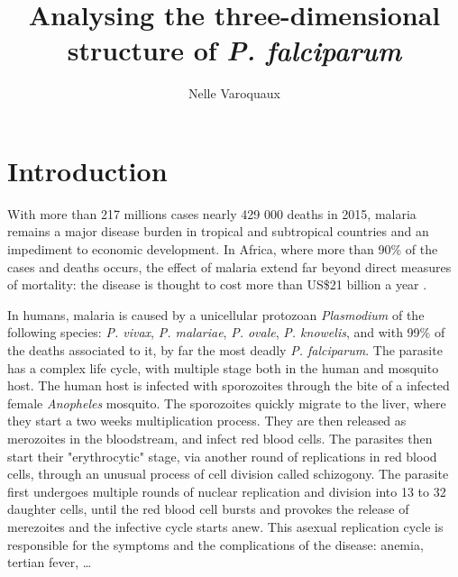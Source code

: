 \documentclass[letterpaper,12pt]{article}
\begin{document}
\title{Analysing the three-dimensional structure of {\em P. falciparum}}
\author{Nelle Varoquaux}



\begin{abstract}

\end{abstract}


\section{Introduction}
\label{sec:introduction}

With more than 217 millions cases nearly 429 000 deaths in 2015,  malaria
remains a major disease burden in tropical and subtropical countries and an
impediment to economic development. In Africa, where more than 90\% of the
cases and deaths occurs, the effect of malaria extend far beyond direct
measures of mortality: the disease is thought to cost more than US\$21
billion a year \citep{onwejkwe:do}.

In humans, malaria is caused by a unicellular protozoan {\em Plasmodium} of
the following species: {\em P. vivax}, {\em P. malariae}, {\em P. ovale}, {\em
P. knowelis}, and with 99\% of the deaths associated to it, by far the most
deadly {\em P. falciparum}. The parasite has a complex life cycle, with
multiple stage both in the human and mosquito host. The human host is infected
with sporozoites through the bite of a infected female  {\em Anopheles}
mosquito. The sporozoites quickly migrate to the liver, where they start a two
weeks multiplication process. They are then released as merozoites in the
bloodstream, and infect red blood cells. The parasites then start their
"erythrocytic" stage, via another round of replications in red blood cells,
through an unusual process of cell division called schizogony. The parasite
first undergoes multiple rounds of nuclear replication and division  into 13
to 32 daughter cells, until the red blood cell bursts and provokes the release
of merezoites and the infective cycle starts anew. This asexual replication
cycle is responsible for the symptoms and the complications of the disease:
anemia, tertian fever, \dots
\end{document}
